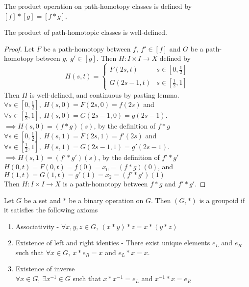 \begin{definition}
	The product operation on path-homotopy classes is defined by $[f]\ast[g] = [f\ast{}g]$.
\end{definition}
\begin{remark} The product of path-homotopic classes is well-defined.\end{remark}
\begin{proof}
	Let $F$ be a path-homotopy between $f,\ f' \in [f]$ and $G$ be a path-homotopy between $g,\ g' \in [g]$. Then $H : I \times I \to X$ defined by
	\[ H(s,t) = \begin{cases} F(2s,t) & s \in [0,\frac{1}{2}] \\ G(2s-1,t) & s \in [\frac{1}{2},1] \end{cases} \]
	Then $H$ is well-defined, and continuous by pasting lemma.\\
	
\noindent $\forall s \in [0,\frac{1}{2}],\ H(s,0) = F(2s,0) = f(2s)$ and\\
	$\forall s \in [\frac{1}{2},1],\ H(s,0) = G(2s-1,0) = g(2s-1)$.\\
	$\implies H(s,0) = (f\ast{}g)(s)$, by the definition of $f\ast{}g$\\

\noindent $\forall s \in [0,\frac{1}{2}],\ H(s,1) = F(2s,1) = f'(2s)$ and\\
	$\forall s \in [\frac{1}{2},1],\ H(s,1) = G(2s-1,1) = g'(2s-1)$.\\
	$\implies H(s,1) = (f'\ast{}g')(s)$, by the definition of $f'\ast{}g'$\\

\noindent $H(0,t) = F(0,t) = f(0) = x_0 = (f\ast{}g)(0)$, and\\
	$H(1,t) = G(1,t) = g'(1) = x_2 =  (f'\ast{}g')(1)$\\

	Then $H : I \times I \to X$ is a path-homotopy between $f\ast{}g$ and $f'\ast{}g'$.
\end{proof}

\begin{definition}[Groupoid]
\begin{commentary}
	Let $G$ be a set and $\ast$ be a binary operation on $G$. Then $(G,\ast)$ is a groupoid if it satisfies the following axioms
	\begin{enumerate}[label=g\arabic*]
		\item Associativity - $\forall x,y,z \in G,\ (x\ast{}y)\ast{}z = x \ast{}(y\ast{}z)$
		\item Existence of left and right identies - There exist unique elements $e_L$ and $e_R$ such that $\forall x \in G,\ x\ast{}e_R = x$ and $e_L\ast{}x = x$.
		\item Existence of inverse\\
			$\forall x \in G,\ \exists x^{-1} \in G$ such that $x \ast{} x^{-1} = e_L$ and $x^{-1} \ast{} x = e_R$
	\end{enumerate}
\end{commentary}
\end{definition}


